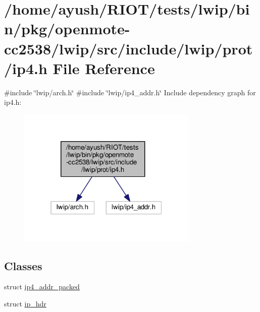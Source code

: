 \hypertarget{openmote-cc2538_2lwip_2src_2include_2lwip_2prot_2ip4_8h}{}\section{/home/ayush/\+R\+I\+O\+T/tests/lwip/bin/pkg/openmote-\/cc2538/lwip/src/include/lwip/prot/ip4.h File Reference}
\label{openmote-cc2538_2lwip_2src_2include_2lwip_2prot_2ip4_8h}
{\ttfamily \#include \char`\"{}lwip/arch.\+h\char`\"{}}\newline
{\ttfamily \#include \char`\"{}lwip/ip4\+\_\+addr.\+h\char`\"{}}\newline
Include dependency graph for ip4.\+h\+:
\nopagebreak
\begin{figure}[H]
\begin{center}
\leavevmode
\includegraphics[width=244pt]{openmote-cc2538_2lwip_2src_2include_2lwip_2prot_2ip4_8h__incl}
\end{center}
\end{figure}
\subsection*{Classes}
\begin{DoxyCompactItemize}
\item 
struct \hyperlink{structip4__addr__packed}{ip4\+\_\+addr\+\_\+packed}
\item 
struct \hyperlink{structip__hdr}{ip\+\_\+hdr}
\end{DoxyCompactItemize}
